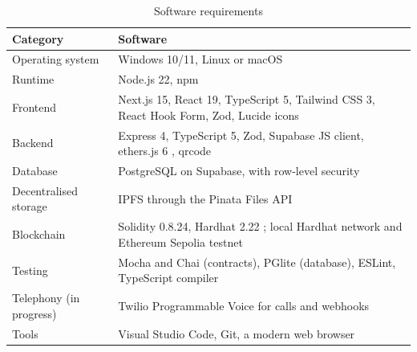 \begin{table}[!ht]
	\caption{Software requirements}
	\label{tab:sw}
	\centering
	\small
	\begin{tabular}{|L{4.5cm}|L{10cm}|}
		\hline
		\textbf{Category} & \textbf{Software} \\ \hline
		Operating system & Windows 10/11, Linux or macOS \\ \hline
		Runtime & Node.js 22, npm \\ \hline
		Frontend & Next.js 15, React 19, TypeScript 5, Tailwind CSS 3, React Hook Form, Zod, Lucide icons \cite{nextjs} \\ \hline
		Backend & Express 4, TypeScript 5, Zod, Supabase JS client, ethers.js 6 \cite{ethers}, qrcode \\ \hline
		Database & PostgreSQL on Supabase, with row-level security \cite{supabase} \\ \hline
		Decentralised storage & IPFS through the Pinata Files API \cite{pinata} \\ \hline
		Blockchain & Solidity 0.8.24, Hardhat 2.22 \cite{hardhat}; local Hardhat network and Ethereum Sepolia testnet \\ \hline
		Testing & Mocha and Chai (contracts), PGlite (database), ESLint, TypeScript compiler \\ \hline
		Telephony (in progress) & Twilio Programmable Voice for calls and webhooks \cite{twiliovoice} \\ \hline
		Tools & Visual Studio Code, Git, a modern web browser \\ \hline
	\end{tabular}
\end{table}
